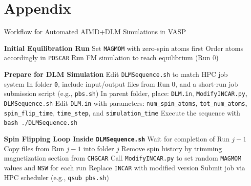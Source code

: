 \documentclass[preprint, 12pt]{elsarticle}
\newcommand{\?}{\stackrel{?}{=}}
\begin{document}
\newpage
\section{Appendix}


\begin{algorithm}
\caption{Workflow for Automated AIMD+DLM Simulations in VASP}
\begin{algorithmic}[1]
\Statex \textbf{Initial Equilibration Run}
\State Set \texttt{MAGMOM} with zero-spin atoms first
\State Order atoms accordingly in \texttt{POSCAR}
\State Run FM simulation to reach equilibrium (Run 0)

\vspace{1ex}
\Statex \textbf{Prepare for DLM Simulation}
\State Edit \texttt{DLMSequence.sh} to match HPC job system
\State In folder \texttt{0}, include input/output files from Run 0, and a short-run job submission script (e.g., \texttt{pbs.sh})
\State In parent folder, place: \texttt{DLM.in}, \texttt{ModifyINCAR.py}, \texttt{DLMSequence.sh}
\State Edit \texttt{DLM.in} with parameters: \texttt{num\_spin\_atoms}, \texttt{tot\_num\_atoms}, \texttt{spin\_flip\_time}, \texttt{time\_step}, and \texttt{simulation\_time}
\State Execute the sequence with \texttt{bash ./DLMSequence.sh}

\vspace{1ex}
\Statex \textbf{Spin Flipping Loop Inside \texttt{DLMSequence.sh}}
    \State Wait for completion of Run $j-1$
    \State Copy files from Run $j-1$ into folder $j$
    \State Remove spin history by trimming magnetization section from \texttt{CHGCAR} 
    \State Call \texttt{ModifyINCAR.py} to set random \texttt{MAGMOM} values and \texttt{NSW} for each run
    \State Replace \texttt{INCAR} with modified version
    \State Submit job via HPC scheduler (e.g., \texttt{qsub pbs.sh})
\EndFor
\end{algorithmic}
\label{AlgoX}
\end{algorithm}

\FloatBarrier



\end{document}
